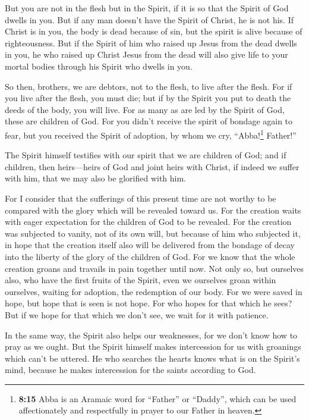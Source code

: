  But you are not in the flesh but in the Spirit, if it is
so that the Spirit of God dwells in you. But if any man doesn't have the
Spirit of Christ, he is not his.  If Christ is in you,
the body is dead because of sin, but the spirit is alive because of
righteousness.  But if the Spirit of him who raised up
Jesus from the dead dwells in you, he who raised up Christ Jesus from
the dead will also give life to your mortal bodies through his Spirit
who dwells in you.

 So then, brothers, we are debtors, not to the flesh, to
live after the flesh.  For if you live after the flesh,
you must die; but if by the Spirit you put to death the deeds of the
body, you will live.  For as many as are led by the
Spirit of God, these are children of God.  For you didn't
receive the spirit of bondage again to fear, but you received the Spirit
of adoption, by whom we cry, ``Abba!\footnote{\textbf{8:15} Abba is an
  Aramaic word for ``Father'' or ``Daddy'', which can be used
  affectionately and respectfully in prayer to our Father in heaven.}
Father!''

 The Spirit himself testifies with our spirit that we are
children of God;  and if children, then heirs---heirs of
God and joint heirs with Christ, if indeed we suffer with him, that we
may also be glorified with him.

 For I consider that the sufferings of this present time
are not worthy to be compared with the glory which will be revealed
toward us.  For the creation waits with eager expectation
for the children of God to be revealed.  For the creation
was subjected to vanity, not of its own will, but because of him who
subjected it, in hope  that the creation itself also will
be delivered from the bondage of decay into the liberty of the glory of
the children of God.  For we know that the whole creation
groans and travails in pain together until now.  Not only
so, but ourselves also, who have the first fruits of the Spirit, even we
ourselves groan within ourselves, waiting for adoption, the redemption
of our body.  For we were saved in hope, but hope that is
seen is not hope. For who hopes for that which he sees? 
But if we hope for that which we don't see, we wait for it with
patience.

 In the same way, the Spirit also helps our weaknesses,
for we don't know how to pray as we ought. But the Spirit himself makes
intercession for us with groanings which can't be uttered.
 He who searches the hearts knows what is on the Spirit's
mind, because he makes intercession for the saints according to God.

